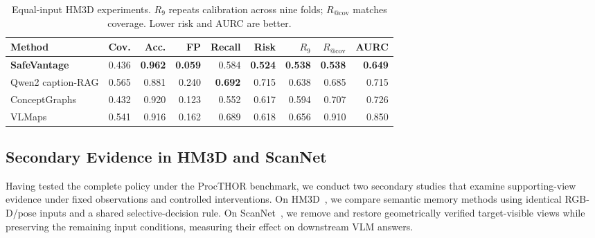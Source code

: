 \documentclass[letterpaper, 10 pt, conference]{ieeeconf}
\begin{document}
    \begin{table}[t]
    \centering
        \caption{
            Equal-input HM3D experiments. $R_9$ repeats calibration across nine folds; $R_{@\mathrm{cov}}$ matches coverage. Lower risk and AURC are better.
        }
        \label{tab:main}
    
        \small
        \renewcommand{\arraystretch}{1.15}
        \begin{tabular*}{\textwidth}{@{\extracolsep{\fill}}lrrrrrrrr@{}}
            \toprule
            Method
            & Cov.
            & Acc.
            & FP
            & Recall
            & Risk
            & $R_9$
            & $R_{@\mathrm{cov}}$
            & AURC \\
            \midrule
    
            \textbf{SafeVantage}
            & 0.436
            & \textbf{0.962}
            & \textbf{0.059}
            & 0.584
            & \textbf{0.524}
            & \textbf{0.538}
            & \textbf{0.538}
            & \textbf{0.649} \\
    
            Qwen2 caption-RAG
            & 0.565
            & 0.881
            & 0.240
            & \textbf{0.692}
            & 0.715
            & 0.638
            & 0.685
            & 0.715 \\
    
            ConceptGraphs
            & 0.432
            & 0.920
            & 0.123
            & 0.552
            & 0.617
            & 0.594
            & 0.707
            & 0.726 \\
    
            VLMaps
            & 0.541
            & 0.916
            & 0.162
            & 0.689
            & 0.618
            & 0.656
            & 0.910
            & 0.850 \\
    
            \bottomrule
        \end{tabular*}
    \end{table}
    

    \subsection{Secondary Evidence in HM3D and ScanNet}
    
    Having tested the complete policy under the ProcTHOR benchmark, we conduct two secondary studies that examine supporting-view evidence under fixed observations and controlled interventions. On HM3D~\citep{yadav2023hm3dsem}, we compare semantic memory methods using identical RGB-D/pose inputs and a shared selective-decision rule. On ScanNet~\citep{dai2017scannet}, we remove and restore geometrically verified target-visible views while preserving the remaining input conditions, measuring their effect on downstream VLM answers.
\end{document}
